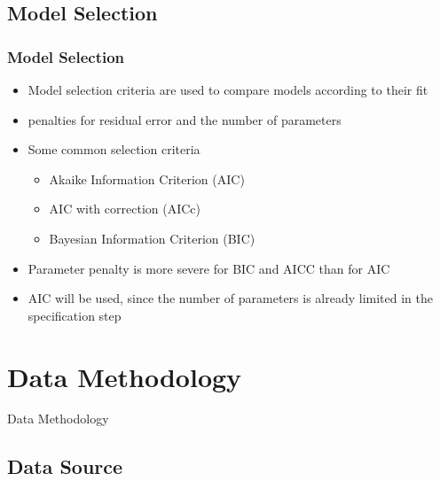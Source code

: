 \documentclass[presentation]{beamer}
\begin{document}
\subsection{Model Selection}

\begin{frame}[t]
\frametitle{Model Selection}
\begin{itemize}
\item{Model selection criteria are used to compare models according to their fit}
\item{penalties for residual error and the number of parameters}
\item{Some common selection criteria
  \begin{itemize}
  \item{Akaike Information Criterion (AIC)}
  \item{AIC with correction (AICc)}
  \item{Bayesian Information Criterion (BIC)}
  \end{itemize}
}
\item{Parameter penalty is more severe for BIC and AICC than for AIC \cite{bisgaard2011time}}
\item{AIC will be used, since the number of parameters is already limited in the specification step}
\end{itemize}
\end{frame}

\section{Data Methodology}

\begin{frame}
\begin{center}
\Large{Data Methodology}
\end{center}
\end{frame}


\subsection{Data Source}
\end{document}
